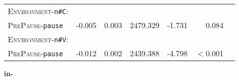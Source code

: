 \begin{table}
{\begin{tabular} {lrrrrrr}
		\textsc{Environment}-\texttt{n\#C}:&&&&&\\
		\textsc{PrePause}-\texttt{pause }&  \color[HTML]{9B9B9B}-0.005& \color[HTML]{9B9B9B}0.003& \color[HTML]{9B9B9B}2479.329 &\color[HTML]{9B9B9B} -1.731& \color[HTML]{9B9B9B}0.084 \\ 
		
		\textsc{Environment}-\texttt{n\#V}:&&&&&\\
		\textsc{PrePause}-\texttt{pause} & -0.012 & 0.002& 2439.388& -4.798& $<$0.001 \\ 
		
		\midrule
			\end{tabular}
}


\end{table}

\vspace*{-0.6cm}
\textbf{{in-}}

\vspace*{-0.3cm}

